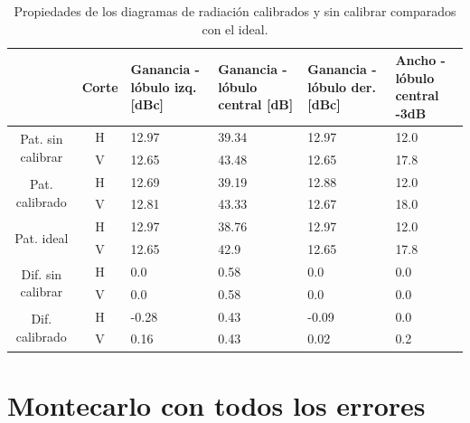 \begin{table}[H]
  \footnotesize
  \centering
  \begin{tabular}{|c|c|p{2cm}|p{2.5cm}|p{2.5cm}|p{2.5cm}|}
    \cline{2-6}
    \multicolumn{1}{c|}{} & Corte & Ganancia - lóbulo izq. [dBc] & Ganancia - lóbulo central [dB] &
    Ganancia - lóbulo der. [dBc] & Ancho - lóbulo central -3dB \tabularnewline\hline
    \multirow{2}{2cm}{Pat. sin calibrar} & H & 12.97 & 39.34 & 12.97 & 12.0 \tabularnewline\cline{2-6}
     & V & 12.65 & 43.48 & 12.65 & 17.8 \tabularnewline\hline
    \multirow{2}{2cm}{Pat. calibrado} & H & 12.69 & 39.19 & 12.88 & 12.0 \tabularnewline\cline{2-6}
     & V & 12.81 & 43.33 & 12.67 & 18.0 \tabularnewline\hline
    \multirow{2}{2cm}{Pat. ideal} & H & 12.97 & 38.76 & 12.97 & 12.0 \tabularnewline\cline{2-6}
     & V & 12.65 & 42.9 & 12.65 & 17.8 \tabularnewline\hline
    \multirow{2}{2cm}{Dif. sin calibrar} & H & 0.0 & 0.58 & 0.0 & 0.0\tabularnewline\cline{2-6}
     & V & 0.0 & 0.58 & 0.0 & 0.0 \tabularnewline\hline
    \multirow{2}{2cm}{Dif. calibrado} & H & -0.28 & 0.43 & -0.09 & 0.0 \tabularnewline\cline{2-6}
     & V & 0.16 & 0.43 & 0.02 & 0.2 \tabularnewline\hline
  \end{tabular}
  \caption{Propiedades de los diagramas de radiación calibrados y sin calibrar comparados con el ideal.}
  \label{tab:wallErrClassical10degRow}
\end{table}

\section{Montecarlo con todos los errores}

